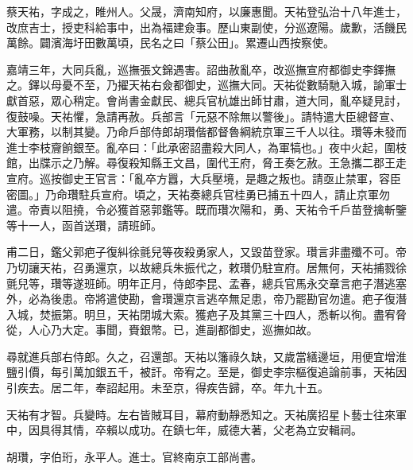 \begin{pinyinscope}
蔡天祐，字成之，睢州人。父晟，濟南知府，以廉惠聞。天祐登弘治十八年進士，改庶吉士，授吏科給事中，出為福建僉事。歷山東副使，分巡遼陽。歲歉，活饑民萬餘。闢濱海圩田數萬頃，民名之曰「蔡公田」。累遷山西按察使。

嘉靖三年，大同兵亂，巡撫張文錦遇害。詔曲赦亂卒，改巡撫宣府都御史李鐸撫之。鐸以母憂不至，乃擢天祐右僉都御史，巡撫大同。天祐從數騎馳入城，諭軍士獻首惡，眾心稍定。會尚書金獻民、總兵官杭雄出師甘肅，道大同，亂卒疑見討，復鼓噪。天祐懼，急請再赦。兵部言「元惡不除無以警後」。請特遣大臣總督宣、大軍務，以制其變。乃命戶部侍郎胡瓚偕都督魯綱統京軍三千人以往。瓚等未發而進士李枝齎餉銀至。亂卒曰：「此承密詔盡殺大同人，為軍犒也。」夜中火起，圍枝館，出牒示之乃解。尋復殺知縣王文昌，圍代王府，脅王奏乞赦。王急攜二郡王走宣府。巡按御史王官言：「亂卒方囂，大兵壓境，是趣之叛也。請亟止禁軍，容臣密圖。」乃命瓚駐兵宣府。頃之，天祐奏總兵官桂勇已捕五十四人，請止京軍勿遣。帝責以阻撓，令必獲首惡郭鑑等。既而瓚次陽和，勇、天祐令千戶苗登擒斬鑒等十一人，函首送瓚，請班師。

甫二日，鑑父郭疤子復糾徐氈兒等夜殺勇家人，又毀苗登家。瓚言非盡殲不可。帝乃切讓天祐，召勇還京，以故總兵朱振代之，敕瓚仍駐宣府。居無何，天祐捕戮徐氈兒等，瓚等遂班師。明年正月，侍郎李昆、孟春，總兵官馬永交章言疤子潛逃塞外，必為後患。帝將遣使勘，會瓚還京言逃卒無足患，帝乃罷勘官勿遣。疤子復潛入城，焚振第。明旦，天祐閉城大索。獲疤子及其黨三十四人，悉斬以徇。盡宥脅從，人心乃大定。事聞，賚銀幣。已，進副都御史，巡撫如故。

尋就進兵部右侍郎。久之，召還部。天祐以籓祿久缺，又歲當繕邊垣，用便宜增淮鹽引價，每引萬加銀五千，被訐。帝宥之。至是，御史李宗樞復追論前事，天祐因引疾去。居二年，奉詔起用。未至京，得疾告歸，卒。年九十五。

天祐有才智。兵變時。左右皆賊耳目，幕府動靜悉知之。天祐廣招星卜藝士往來軍中，因具得其情，卒賴以成功。在鎮七年，威德大著，父老為立安輯祠。

胡瓚，字伯珩，永平人。進士。官終南京工部尚書。


\end{pinyinscope}
